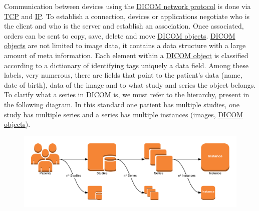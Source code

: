 \documentclass{tufte-book} %
\begin{document}
Communication between devices using the \href{https://www.ncbi.nlm.nih.gov/pmc/articles/PMC61235/}{DICOM network protocol} is done via \href{https://en.wikipedia.org/wiki/Transmission_Control_Protocol}{TCP} and \href{https://en.wikipedia.org/wiki/IP_address}{IP}. To establish a connection, devices or applications negotiate who is the client and who is the server and establish an association. Once associated, orders can be sent to copy, save, delete and move \href{http://isdis.net/wp-content/uploads/2015/12/caffery_objects_IM.pdf}{DICOM objects}. \href{http://isdis.net/wp-content/uploads/2015/12/caffery_objects_IM.pdf}{DICOM objects} are not limited to image data, it contains a data structure with a large amount of meta information. Each element within a \href{http://isdis.net/wp-content/uploads/2015/12/caffery_objects_IM.pdf}{DICOM object} is classified according to a dictionary of identifying tags uniquely a data field. Among these labels, very numerous, there are fields that point to the patient's data (name, date of birth), data of the image and to what study and series the object belongs. To clarify what a series in \href{http://isdis.net/wp-content/uploads/2015/12/caffery_objects_IM.pdf}{DICOM} is, we must refer to the hierarchy, present in the following diagram. In this standard one patient has multiple studies, one study has multiple series and a series has multiple instances (images, \href{http://isdis.net/wp-content/uploads/2015/12/caffery_objects_IM.pdf}{DICOM objects}).


\hfill

\begin{figure}[!hbt]
\begin{center}
\includegraphics[width=\textwidth]{graphics/dicom_objects.png}
\end{center}
\end{figure}

\hfill

\end{document}
